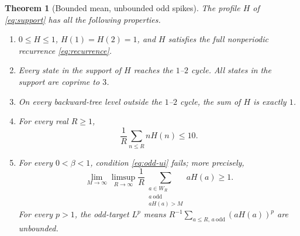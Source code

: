 \documentclass[11pt,a4paper]{article}
\newtheorem{theorem}{Theorem}
\begin{document}
\begin{theorem}[Bounded mean, unbounded odd spikes]\label{thm:spine}
The profile $H$ of \eqref{eq:support} has all the following properties.
\begin{enumerate}
\item $0\le H\le1$, $H(1)=H(2)=1$, and $H$ satisfies the full
      nonperiodic recurrence \eqref{eq:recurrence}.
\item Every state in the support of $H$ reaches the $1$--$2$ cycle.
      All states in the support are coprime to $3$.
\item On every backward-tree level outside the $1$--$2$ cycle,
      the sum of $H$ is exactly $1$.
\item For every real $R\ge1$,
      \begin{equation}\label{eq:mean}
       \frac1R\sum_{n\le R}nH(n)\le10.
      \end{equation}
\item For every $0<\beta<1$, condition \eqref{eq:odd-ui} fails;
      more precisely,
      \begin{equation}\label{eq:odd-spike}
       \lim_{M\to\infty}\limsup_{R\to\infty}
       \frac1R\sum_{\substack{a\in W_R\\ a\ \mathrm{odd}\\aH(a)>M}}
       aH(a)\ge1.
      \end{equation}
      For every $p>1$, the odd-target $L^p$ means
      $R^{-1}\sum_{a\le R,\,a\ \mathrm{odd}}(aH(a))^p$ are unbounded.
\end{enumerate}
\end{theorem}
\end{document}

